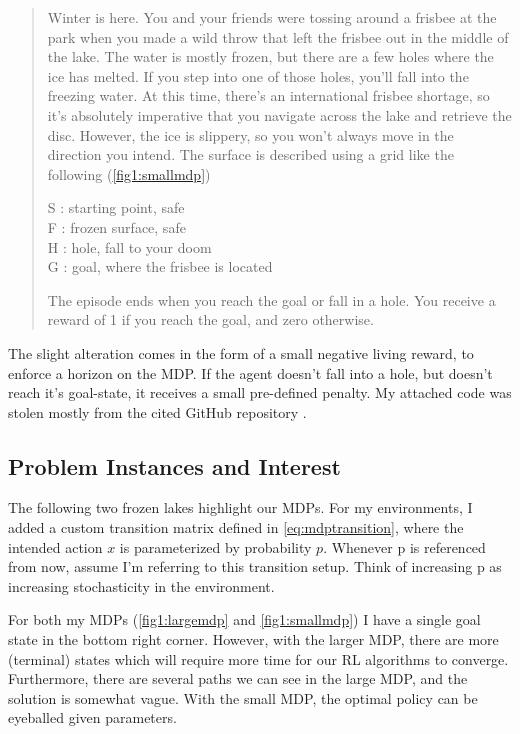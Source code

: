 \documentclass[letter]{article}
\begin{document}
\begin{quote}
    Winter is here. You and your friends were tossing around a frisbee at the park
    when you made a wild throw that left the frisbee out in the middle of the lake.
    The water is mostly frozen, but there are a few holes where the ice has melted.
    If you step into one of those holes, you'll fall into the freezing water.
    At this time, there's an international frisbee shortage, so it's absolutely imperative that
    you navigate across the lake and retrieve the disc.
    However, the ice is slippery, so you won't always move in the direction you intend.
    The surface is described using a grid like the following (\ref{fig1:smallmdp})

    S : starting point, safe\\
    F : frozen surface, safe\\
    H : hole, fall to your doom\\
    G : goal, where the frisbee is located

    The episode ends when you reach the goal or fall in a hole.
    You receive a reward of 1 if you reach the goal, and zero otherwise.
\end{quote}
The slight alteration comes in the form of a small negative living reward, to enforce a horizon on the MDP. If the agent doesn't fall into a hole, but doesn't reach it's goal-state, it receives a small pre-defined penalty. My attached code was stolen mostly from the cited GitHub repository \autocite{cmaron-github}.

\subsection{Problem Instances and Interest}
The following two frozen lakes highlight our MDPs. For my environments, I added a custom transition matrix defined in \ref{eq:mdptransition}, where the intended action $x$ is parameterized by probability $p$. Whenever p is referenced from now, assume I'm referring to this transition setup. Think of increasing p as increasing stochasticity in the environment.

For both my MDPs (\ref{fig1:largemdp} and \ref{fig1:smallmdp}) I have a single goal state in the bottom right corner. However, with the larger MDP, there are more (terminal) states which will require more time for our RL algorithms to converge. Furthermore, there are several paths we can see in the large MDP, and the solution is somewhat vague. With the small MDP, the optimal policy can be eyeballed given parameters. 
\end{document}
